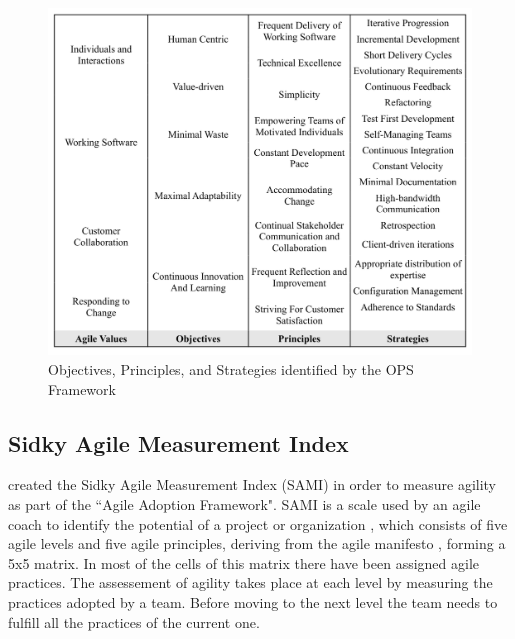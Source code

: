 \begin{figure} [H]
\centerline{\includegraphics[scale=0.75]{include/relatedwork/fig/ops.pdf}}
\caption{Objectives, Principles, and Strategies identified by the OPS Framework} 
\label{objectives_principles_strategies}
\end{figure} 

%

\subsection{Sidky Agile Measurement Index} %
\citet{sidky_dissertation} created the Sidky Agile Measurement Index (SAMI) in order to measure agility as part of the ``Agile Adoption Framework". SAMI is a scale used by an agile coach to identify the potential of a project or organization \cite{sidky}, which consists of five agile levels and five agile principles, deriving from the agile manifesto \cite{beck2001agile}, forming a 5x5 matrix. In most of the cells of this matrix there have been assigned agile practices. The assessement of agility takes place at each level by measuring the practices adopted by a team. Before moving to the next level the team needs to fulfill all the practices of the current one.

